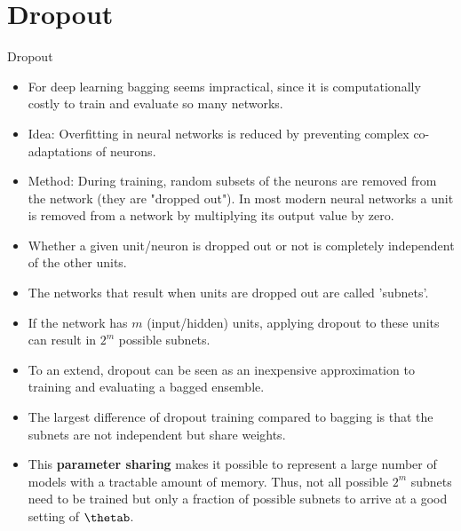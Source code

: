 \section{Dropout}


\begin{vbframe}{Dropout}
\begin{itemize}
\item{For deep learning bagging seems impractical, since it is computationally costly to train and evaluate so many networks.}
\item Idea: Overfitting in neural networks is reduced by preventing complex
co-adaptations of neurons.
\item Method: During training, random subsets of the neurons are removed from the network (they are "dropped out"). In most modern neural networks a unit is removed from a network by multiplying its output value by zero.
\item Whether a given unit/neuron is dropped out or not is completely independent of the other units.
\item The networks that result when units are dropped out are called 'subnets'.
\item If the network has $m$ (input/hidden) units, applying dropout to these units can result in $2^m$ possible subnets.
\item To an extend, dropout can be seen as an inexpensive approximation to training and evaluating a bagged ensemble.
\item The largest difference of dropout training compared to bagging is that the subnets are not independent but share weights. 
\item This \textbf{parameter sharing} makes it possible to represent a large number of models with a tractable amount of memory. Thus, not all possible $2^m$ subnets need to be trained but only a fraction of possible subnets to arrive at a good setting of $\thetab$.
\end{itemize}
\end{vbframe}  

